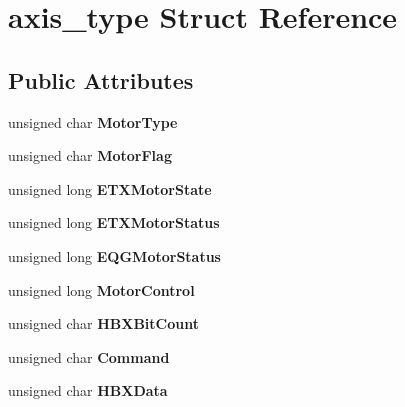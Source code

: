 \hypertarget{structaxis__type}{}\section{axis\+\_\+type Struct Reference}
\label{structaxis__type}
\subsection*{Public Attributes}
\begin{DoxyCompactItemize}
\item 
\mbox{\label{structaxis__type_a8d6e2614b5b9ced9a557fa59a22543ed}} 
unsigned char {\bfseries Motor\+Type}
\item 
\mbox{\label{structaxis__type_aa70145fea3079f5b250d4f1586f2223c}} 
unsigned char {\bfseries Motor\+Flag}
\item 
\mbox{\label{structaxis__type_a1192a02117a60694ac5574eda88b8ea7}} 
unsigned long {\bfseries E\+T\+X\+Motor\+State}
\item 
\mbox{\label{structaxis__type_a7935fe762d46b59a84ea8f423b434782}} 
unsigned long {\bfseries E\+T\+X\+Motor\+Status}
\item 
\mbox{\label{structaxis__type_a45ac919db125d0953e3adab20c1542df}} 
unsigned long {\bfseries E\+Q\+G\+Motor\+Status}
\item 
\mbox{\label{structaxis__type_aaa45704c8f826b1d2e73fe749005cfa2}} 
unsigned long {\bfseries Motor\+Control}
\item 
\mbox{\label{structaxis__type_af5ea840e77e4a91bae5bcacede0855b6}} 
unsigned char {\bfseries H\+B\+X\+Bit\+Count}
\item 
\mbox{\label{structaxis__type_a4c9b959520501d8bba6c7074f7128b17}} 
unsigned char {\bfseries Command}
\item 
\mbox{\label{structaxis__type_a877b0c8c30498ce9338b82d65ca5ac79}} 
unsigned char {\bfseries H\+B\+X\+Data}
\item 
\mbox{\label{structaxis__type_acaf4a45ba2953d3f8eebf12758e715a1}} 

\end{DoxyCompactItemize}
